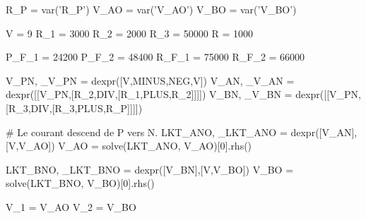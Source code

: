 \documentclass[12pt,titlepage]{article}
\begin{document}
\newpage
\begin{sagesilent}
	R_P = var('R_P')
	V_AO = var('V_AO')
	V_BO = var('V_BO')

	V = 9
	R_1 = 3000
	R_2 = 2000
	R_3 = 50000
	R = 1000

	P_F_1 = 24200
	P_F_2 = 48400
	R_F_1 = 75000
	R_F_2 = 66000

	V_PN, _V_PN = dexpr([V,MINUS,NEG,V])
	V_AN, _V_AN = dexpr([[V_PN,[R_2,DIV,[R_1,PLUS,R_2]]]])
	V_BN, _V_BN = dexpr([[V_PN,[R_3,DIV,[R_3,PLUS,R_P]]]])

	# Le courant descend de P vers N.
	LKT_ANO, _LKT_ANO = dexpr([V_AN],[V,V_AO])
	V_AO = solve(LKT_ANO, V_AO)[0].rhs()

	LKT_BNO, _LKT_BNO = dexpr([V_BN],[V,V_BO])
	V_BO = solve(LKT_BNO, V_BO)[0].rhs()

	V_1 = V_AO
	V_2 = V_BO
\end{sagesilent}
\end{document}
